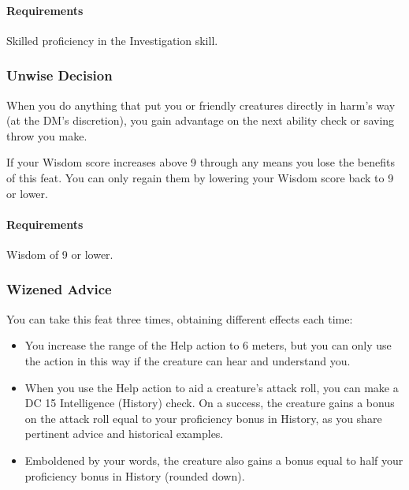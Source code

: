     \paragraph{Requirements} Skilled proficiency in the Investigation skill.
\subsubsection{Unwise Decision} \label{feat::unwisedecision}
    When you do anything that put you or friendly creatures directly in harm's way (at the DM's discretion), you gain advantage on the next ability check or saving throw you make.

    If your Wisdom score increases above 9 through any means you lose the benefits of this feat.
    You can only regain them by lowering your Wisdom score back to 9 or lower.
    \paragraph{Requirements} Wisdom of 9 or lower.
%
%
%
\subsubsection{Wizened Advice} \label{feat::wizenedadvice}
    You can take this feat three times, obtaining different effects each time:
    \begin{itemize}
        \item You increase the range of the Help action to 6 meters, but you can only use the action in this way if the creature can hear and understand you.
        \item When you use the Help action to aid a creature's attack roll, you can make a DC 15 Intelligence (History) check.
        On a success, the creature gains a bonus on the attack roll equal to your proficiency bonus in History, as you share pertinent advice and historical examples.
        \item Emboldened by your words, the creature also gains a bonus equal to half your proficiency bonus in History (rounded down).
    \end{itemize}
